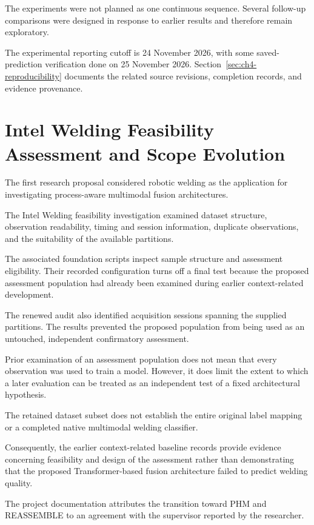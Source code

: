 The experiments were not planned as one continuous sequence. Several follow-up comparisons were designed in response to earlier results and therefore remain exploratory.

The experimental reporting cutoff is 24 November 2026, with some saved-prediction verification done on 25 November 2026. Section~\ref{sec:ch4-reproducibility} documents the related source revisions, completion records, and evidence provenance.

\section{Intel Welding Feasibility Assessment and Scope Evolution}

The first research proposal considered robotic welding as the application for investigating process-aware multimodal fusion architectures.

The Intel Welding feasibility investigation examined dataset structure, observation readability, timing and session information, duplicate observations, and the suitability of the available partitions.

The associated foundation scripts inspect sample structure and assessment eligibility. Their recorded configuration turns off a final test because the proposed assessment population had already been examined during earlier context-related development.

The renewed audit also identified acquisition sessions spanning the supplied partitions. The results prevented the proposed population from being used as an untouched, independent confirmatory assessment.

Prior examination of an assessment population does not mean that every observation was used to train a model. However, it does limit the extent to which a later evaluation can be treated as an independent test of a fixed architectural hypothesis.

The retained dataset subset does not establish the entire original label mapping or a completed native multimodal welding classifier.

Consequently, the earlier context-related baseline records provide evidence concerning feasibility and design of the assessment rather than demonstrating that the proposed Transformer-based fusion architecture failed to predict welding quality.

The project documentation attributes the transition toward PHM and REASSEMBLE to an agreement with the supervisor reported by the researcher.

